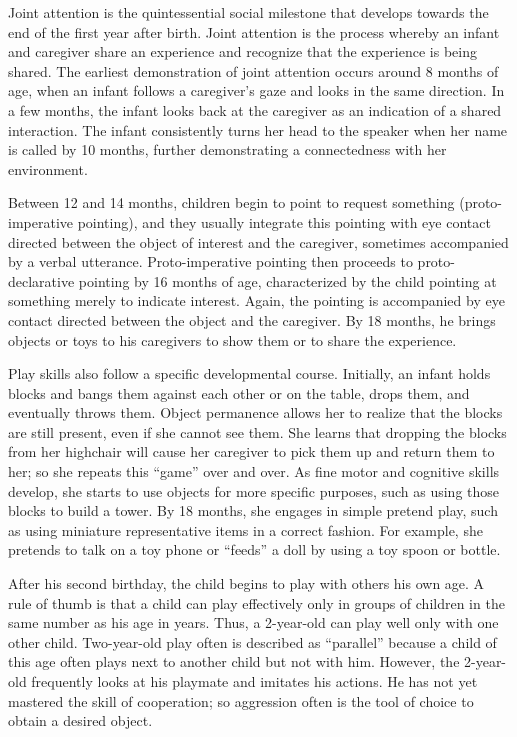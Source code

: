 Joint attention is the quintessential social milestone that develops towards
the end of the first year after birth. Joint attention is the process whereby
an infant and caregiver share an experience and recognize that the experience
is being shared. The earliest demonstration of joint attention occurs around 8
months of age, when an infant follows a caregiver’s gaze and looks in the same
direction. In a few months, the infant looks back at the caregiver as an
indication of a shared interaction. The infant consistently turns her head to
the speaker when her name is called by 10 months, further demonstrating a
connectedness with her environment. \cite{Gerber2011}

Between 12 and 14 months, children begin to point to request something
(proto-imperative pointing), and they usually integrate this pointing with eye
contact directed between the object of interest and the caregiver, sometimes
accompanied by a verbal utterance. Proto-imperative pointing then proceeds to
proto-declarative pointing by 16 months of age, characterized by the child
pointing at something merely to indicate interest. Again, the pointing is
accompanied by eye contact directed between the object and the caregiver. By 18
months, he brings objects or toys to his caregivers to show them or to share
the experience. \cite{Gerber2011}

Play skills also follow a specific developmental course. Initially, an infant
holds blocks and bangs them against each other or on the table, drops them, and
eventually throws them. Object permanence allows her to realize that the blocks
are still present, even if she cannot see them. She learns that dropping the
blocks from her highchair will cause her caregiver to pick them up and return
them to her; so she repeats this “game” over and over. As fine motor and
cognitive skills develop, she starts to use objects for more specific purposes,
such as using those blocks to build a tower. By 18 months, she engages in
simple pretend play, such as using miniature representative items in a correct
fashion. For example, she pretends to talk on a toy phone or “feeds” a doll by
using a toy spoon or bottle. \cite{Gerber2011}

After his second birthday, the child begins to play with others his own age. A
rule of thumb is that a child can play effectively only in groups of children
in the same number as his age in years. Thus, a 2-year-old can play well only
with one other child. Two-year-old play often is described as “parallel”
because a child of this age often plays next to another child but not with him.
However, the 2-year-old frequently looks at his playmate and imitates his
actions. He has not yet mastered the skill of cooperation; so aggression often
is the tool of choice to obtain a desired object. \cite{Gerber2011}

